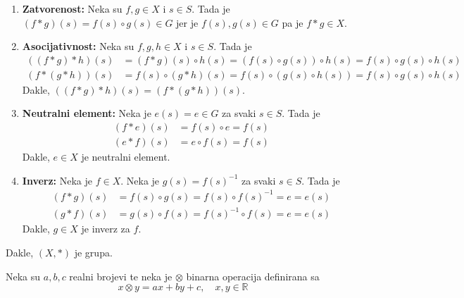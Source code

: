 \documentclass{exam}
\begin{document}
\begin{questions}
\begin{solution}
  \begin{enumerate}
    \item \textbf{Zatvorenost:} Neka su $f, g \in X$ i $s \in S$. Tada je $(f * g)(s) = f(s) \circ g(s) \in G$ jer je $f(s), g(s) \in G$ pa je $f * g \in X$.
    \item \textbf{Asocijativnost:} Neka su $f, g, h \in X$ i $s \in S$. Tada je
      \begin{align*}
        ((f * g) * h)(s) &= (f * g)(s) \circ h(s) = (f(s) \circ g(s)) \circ h(s) = f(s) \circ g(s) \circ h(s)\\
        (f * (g * h))(s) &= f(s) \circ (g * h)(s) = f(s) \circ (g(s) \circ h(s)) = f(s) \circ g(s) \circ h(s)
      \end{align*}
      Dakle, $((f * g) * h)(s) = (f * (g * h))(s)$.
    \item \textbf{Neutralni element:} Neka je $e(s) = e \in G$ za svaki $s \in S$. Tada je
      \begin{align*}
        (f * e)(s) &= f(s) \circ e = f(s)\\
        (e * f)(s) &= e \circ f(s) = f(s)
      \end{align*}
      Dakle, $e \in X$ je neutralni element.
    \item \textbf{Inverz:} Neka je $f \in X$. Neka je $g(s) = f(s)^{-1}$ za svaki $s \in S$. Tada je
      \begin{align*}
        (f * g)(s) &= f(s) \circ g(s) = f(s) \circ f(s)^{-1} = e = e(s)\\
        (g * f)(s) &= g(s) \circ f(s) = f(s)^{-1} \circ f(s) = e = e(s)
      \end{align*}
      Dakle, $g \in X$ je inverz za $f$.
  \end{enumerate}
  Dakle, $(X, *)$ je grupa.
\end{solution}

\pagebreak

\question Neka su $a, b, c$ realni brojevi te neka je $\otimes$ binarna operacija definirana sa
\[
  x \otimes y = ax + by + c, \quad x, y \in \mathbb{R}
\]


\end{questions}
\end{document}
